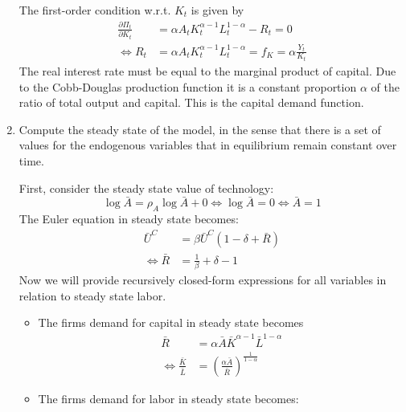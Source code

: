 \begin{enumerate}
\begin{solution}
              The first-order condition w.r.t. $K_{t}$ is given by
              \begin{align*}
                  \frac{\partial \Pi_t}{\partial K_{t}} & = \alpha A_t K_t^{\alpha-1} L_t^{1-\alpha} - R_t = 0                      \\
                  \Leftrightarrow R_t                   & = \alpha A_t K_t^{\alpha-1} L_t^{1-\alpha} = f_K = \alpha \frac{Y_t}{K_t}
              \end{align*}
              The real interest rate must be equal to the marginal product of capital. Due to the Cobb-Douglas production function it is a constant proportion $\alpha$ of the ratio of total output and capital. This is the capital demand function.
          \end{solution}
    \item Compute the steady state of the model, in the sense that there is a set of values for the endogenous variables that in equilibrium remain constant over time.
          \begin{solution}
              First, consider the steady state value of technology:
              $$\log\bar{A}=\rho_A \log\bar{A} + 0 \Leftrightarrow \log\bar{A} = 0 \Leftrightarrow \bar{A} = 1$$
              The Euler equation in steady state becomes:
              \begin{align*}
                  \bar{U}^C               & = \beta \bar{U}^C(1-\delta+\bar{R}) \\
                  \Leftrightarrow \bar{R} & = \frac{1}{\beta} + \delta - 1
              \end{align*}
              Now we will provide recursively closed-form expressions for all variables in relation to steady state labor.
              \begin{itemize}
                  \item The firms demand for capital in steady state becomes
                        \begin{align*}
                            \bar{R}                                 & = \alpha \bar{A} \bar{K}^{\alpha-1}\bar{L}^{1-\alpha}              \\
                            \Leftrightarrow \frac{\bar{K}}{\bar{L}} & = \left(\frac{\alpha \bar{A}}{\bar{R}}\right)^{\frac{1}{1-\alpha}}
                        \end{align*}
                  \item The firms demand for labor in steady state becomes:
                        \begin{align*}

\end{align*}
\end{itemize}
\end{solution}
\end{enumerate}
